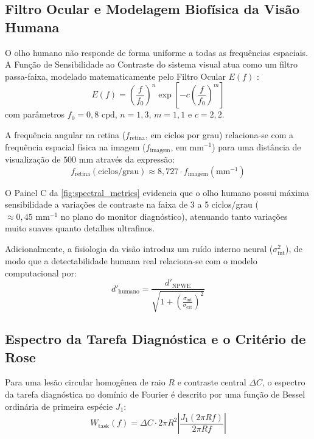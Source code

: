 \subsection{Filtro Ocular e Modelagem Biofísica da Visão Humana}
O olho humano não responde de forma uniforme a todas as frequências espaciais. A Função de Sensibilidade ao Contraste do sistema visual atua como um filtro passa-faixa, modelado matematicamente pelo Filtro Ocular $E(f)$ \cite{burgess1994, aapm_tg233_2019}:
\begin{equation}
  E(f) = \left( \frac{f}{f_0} \right)^n \exp\left[ -c \left( \frac{f}{f_0} \right)^m \right]
  \label{eq:eye_filter}
\end{equation}
com parâmetros $f_0 = 0{,}8 \text{ cpd}$, $n = 1{,}3$, $m = 1{,}1$ e $c = 2{,}2$.

A frequência angular na retina ($f_{\text{retina}}$, em ciclos por grau) relaciona-se com a frequência espacial física na imagem ($f_{\text{imagem}}$, em $\text{mm}^{-1}$) para uma distância de visualização de $500 \text{ mm}$ através da expressão:
\begin{equation}
  f_{\text{retina}} (\text{ciclos/grau}) \approx 8{,}727 \cdot f_{\text{imagem}} (\text{mm}^{-1})
  \label{eq:fretina}
\end{equation}

O Painel C da \cref{fig:spectral_metrics} evidencia que o olho humano possui máxima sensibilidade a variações de contraste na faixa de 3 a 5 ciclos/grau ($\approx 0{,}45 \text{ mm}^{-1}$ no plano do monitor diagnóstico), atenuando tanto variações muito suaves quanto detalhes ultrafinos.

Adicionalmente, a fisiologia da visão introduz um ruído interno neural ($\sigma_{\text{int}}^2$), de modo que a detectabilidade humana real relaciona-se com o modelo computacional por:
\begin{equation}
  d'_{\text{humano}} = \frac{d'_{\text{NPWE}}}{\sqrt{1 + \left(\frac{\sigma_{\text{int}}}{\sigma_{\text{ext}}}\right)^2}}
  \label{eq:dprime_humano_int}
\end{equation}

\subsection{Espectro da Tarefa Diagnóstica e o Critério de Rose}
Para uma lesão circular homogênea de raio $R$ e contraste central $\Delta C$, o espectro da tarefa diagnóstica no domínio de Fourier é descrito por uma função de Bessel ordinária de primeira espécie $J_1$:
\begin{equation}
  W_{\text{task}}(f) = \Delta C \cdot 2\pi R^2 \left| \frac{J_1(2\pi R f)}{2\pi R f} \right|
  \label{eq:wtask}
\end{equation}

